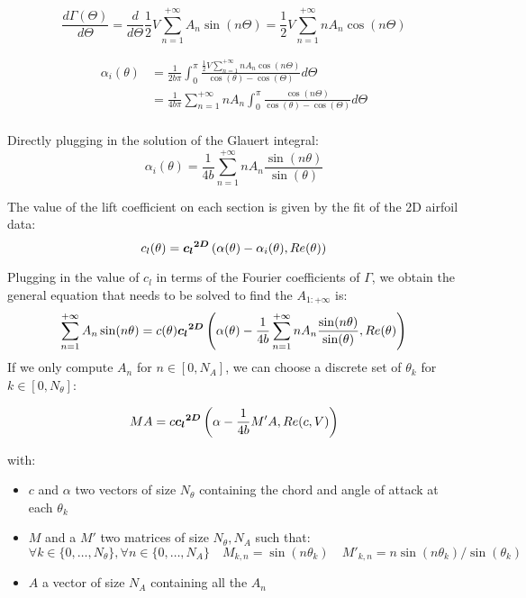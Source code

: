 \documentclass[letterpaper,12pt]{article}
\begin{document}
$$\frac{d\Gamma(\Theta)}{d\Theta} = \frac{d}{d\Theta}\frac12 V\sum_{n=1}^{+\infty} A_n \sin(n\Theta)  = \frac{1}{2} V\sum_{n=1}^{+\infty} n A_n \cos(n\Theta) $$

\begin{align*}
	\alpha_i(\theta) &= \frac{1}{2b\pi }  \int_{0}^{\pi} \frac{ \frac{1}{2} V\sum_{n=1}^{+\infty} n A_n \cos(n\Theta) }{\cos(\theta)-\cos(\Theta)} d\Theta	\\
				&= \frac{1}{4b\pi }  \sum_{n=1}^{+\infty} n A_n \int_{0}^{\pi} \frac{ \cos(n\Theta) }{\cos(\theta)-\cos(\Theta)} d\Theta	\\
\end{align*}

Directly plugging in the solution of the Glauert integral:
$$ \alpha_i(\theta) = \frac {1}{4b}  \sum_{n=1}^{+\infty} n A_n \frac{ \sin(n\theta) }{\sin(\theta)} 	$$

The value of the lift coefficient on each section is given by the fit of the 2D airfoil data:
$$c_l(\theta) = \boldsymbol{{c_l}^{2D}} \left( \alpha(\theta) - \alpha_i(\theta), Re(\theta)\right)$$

Plugging in the value of $c_l$ in terms of the Fourier coefficients of $\Gamma$,
we obtain the general equation that needs to be solved to find the $A_{1:+\infty}$ is:
%
$$
\sum_{n=1}^{+\infty} A_n \sin(n\theta) = c(\theta) \boldsymbol{{c_l}^{2D}} \left( \alpha(\theta) - \frac {1}{4b}  \sum_{n=1}^{+\infty} n A_n \frac{ \sin(n\theta) }{\sin(\theta)} , Re(\theta)\right)
$$
%
If we only compute $A_{n}$ for $n \in [0, N_A]$, we can choose a discrete set of $\theta_k$ for $k \in [0, N_{\theta}]$:

\begin{equation}
	MA = c \boldsymbol{{c_l}^{2D}} \left( \alpha - \frac {1}{4b} M' A , Re(c, V)\right) 
\end{equation}

with:
\begin{itemize}
	\item[] $c$ and $\alpha$ two vectors of size $N_{\theta}$ containing the chord and angle of attack at each $\theta_k$
	\item[] $M$ and a $M'$ two matrices of size $N_{\theta}, N_A$ such that: 
	$$ \forall k\in \{0,\dots, N_{\theta}\}, \forall n \in \{0,\dots, N_A\} \quad M_{k,n} = \sin(n\theta_k) \quad {M'}_{k,n} = n\sin(n\theta_k)/\sin(\theta_k)$$
	\item[] $A$ a vector of size $N_A$ containing all the $A_n$
\end{itemize}
\end{document}

